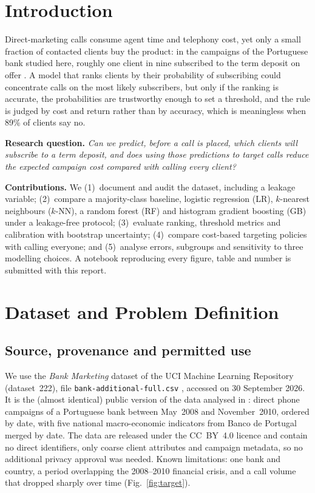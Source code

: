 \documentclass[conference]{IEEEtran}
\begin{document}
\section{Introduction}
Direct-marketing calls consume agent time and telephony cost, yet only a small fraction of contacted clients buy the product: in the campaigns of the Portuguese bank studied here, roughly one client in nine subscribed to the term deposit on offer \cite{moro2014}. A model that ranks clients by their probability of subscribing could concentrate calls on the most likely subscribers, but only if the ranking is accurate, the probabilities are trustworthy enough to set a threshold, and the rule is judged by cost and return rather than by accuracy, which is meaningless when 89\% of clients say no.

\textbf{Research question.} \emph{Can we predict, before a call is placed, which clients will subscribe to a term deposit, and does using those predictions to target calls reduce the expected campaign cost compared with calling every client?}

\textbf{Contributions.} We (1)~document and audit the dataset, including a leakage variable; (2)~compare a majority-class baseline, logistic regression (LR), $k$-nearest neighbours ($k$-NN), a random forest (RF) and histogram gradient boosting (GB) under a leakage-free protocol; (3)~evaluate ranking, threshold metrics and calibration with bootstrap uncertainty; (4)~compare cost-based targeting policies with calling everyone; and (5)~analyse errors, subgroups and sensitivity to three modelling choices. A notebook reproducing every figure, table and number is submitted with this report.

\section{Dataset and Problem Definition}
\subsection{Source, provenance and permitted use}
We use the \emph{Bank Marketing} dataset of the UCI Machine Learning Repository (dataset~222), file \texttt{bank-additional-full.csv} \cite{uci_bank}, accessed on 30 September 2026. It is the (almost identical) public version of the data analysed in \cite{moro2014}: direct phone campaigns of a Portuguese bank between May~2008 and November~2010, ordered by date, with five national macro-economic indicators from Banco de Portugal merged by date. The data are released under the CC~BY~4.0 licence and contain no direct identifiers, only coarse client attributes and campaign metadata, so no additional privacy approval was needed. Known limitations: one bank and country, a period overlapping the 2008--2010 financial crisis, and a call volume that dropped sharply over time (Fig.~\ref{fig:target}).
\end{document}
